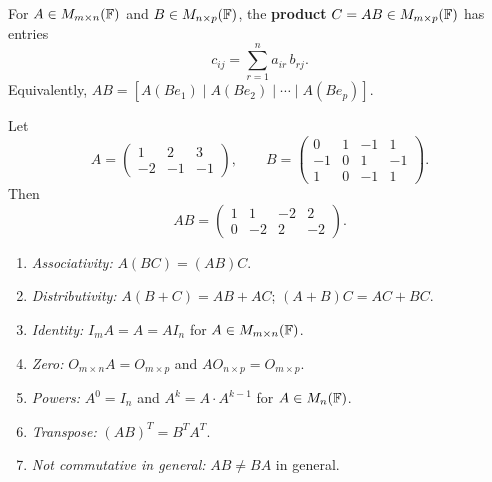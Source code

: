 \begin{defbox}
For $A\in M_{m\times n}(\mathbb{F})$ and $B\in M_{n\times p}(\mathbb{F})$, the \textbf{product} $C=AB\in M_{m\times p}(\mathbb{F})$
has entries
\[
    c_{ij} = \sum_{r=1}^{n} a_{ir}\,b_{rj}.
\]
Equivalently, $AB = [A(Be_1)\mid A(Be_2)\mid\cdots\mid A(Be_p)]$.
\end{defbox}

\begin{exbox}
Let
\[
    A = \begin{pmatrix}1&2&3\\-2&-1&-1\end{pmatrix}, \qquad
    B = \begin{pmatrix}0&1&-1&1\\-1&0&1&-1\\1&0&-1&1\end{pmatrix}.
\]
Then
\[
    AB = \begin{pmatrix}1&1&-2&2\\0&-2&2&-2\end{pmatrix}.
\]
\end{exbox}

\begin{propbox}
\begin{enumerate}
    \item \emph{Associativity:} $A(BC)=(AB)C$.
    \item \emph{Distributivity:} $A(B+C)=AB+AC$; $(A+B)C=AC+BC$.
    \item \emph{Identity:} $I_m A = A = A I_n$ for $A\in M_{m\times n}(\mathbb{F})$.
    \item \emph{Zero:} $O_{m\times n}A = O_{m\times p}$ and
          $AO_{n\times p}=O_{m\times p}$.
    \item \emph{Powers:} $A^0=I_n$ and $A^k=A\cdot A^{k-1}$ for $A\in M_{n}(\mathbb{F})$.
    \item \emph{Transpose:} $(AB)^T = B^T A^T$.
    \item \emph{Not commutative in general:} $AB\neq BA$ in general.
\end{enumerate}
\end{propbox}

